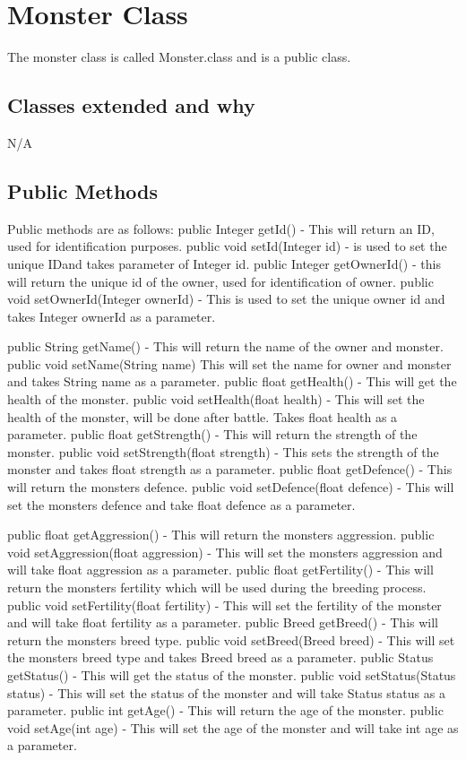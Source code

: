 \documentclass{project}
\begin{document}
\section{Monster Class}
The monster class is called Monster.class and is a public class.
\subsection{Classes extended and why}
N/A
\subsection{Public Methods}
Public methods are as follows:        
public Integer getId() - This will return an ID, used for identification purposes. public void setId(Integer id) - is used to set the unique IDand takes parameter of Integer id. public Integer getOwnerId() - this will return the unique id of the owner, used for identification of owner. public void setOwnerId(Integer ownerId) - This is used to set the unique owner id and takes Integer ownerId as a parameter.

public String getName() - This will return the name of the owner and monster. public void setName(String name) This will set the name for owner and monster and takes String name as a parameter.
public float getHealth() - This will get the health of the monster. public void setHealth(float health) - This will set the health of the monster, will be done after battle. Takes float health as a parameter.
public float getStrength() - This will return the strength of the monster. public void setStrength(float strength) - This sets the strength of the monster and takes float strength as a parameter.
public float getDefence() - This will return the monsters defence. public void setDefence(float defence) - This will set the monsters defence and take float defence as a parameter.

public float getAggression() - This will return the monsters aggression. public void setAggression(float aggression) - This will set the monsters aggression and will take float aggression as a parameter.
public float getFertility() - This will return the monsters fertility which will be used during the breeding process. public void setFertility(float fertility) - This will set the fertility of the monster and will take float fertility as a parameter.
public Breed getBreed() - This will return the monsters breed type. public void setBreed(Breed breed) - This will set the monsters breed type and takes Breed breed as a parameter.
public Status getStatus() - This will get the status of the monster. public void setStatus(Status status) - This will set the status of the monster and will take Status status as a parameter.
public int getAge() - This will return the age of the monster. public void setAge(int age) - This will set the age of the monster and will take int age as a parameter.
\end{document}

